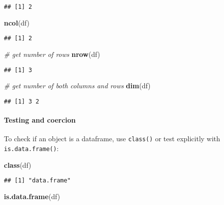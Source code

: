 \documentclass[
]{book}
\newenvironment{Shaded}{\begin{snugshade}}{\end{snugshade}}
\newcommand{\CommentTok}[1]{\textcolor[rgb]{0.56,0.35,0.01}{\textit{#1}}}
\newcommand{\KeywordTok}[1]{\textcolor[rgb]{0.13,0.29,0.53}{\textbf{#1}}}
\newcommand{\NormalTok}[1]{#1}
\begin{document}
\begin{verbatim}
## [1] 2
\end{verbatim}

\begin{Shaded}
\begin{Highlighting}[]
\KeywordTok{ncol}\NormalTok{(df)}
\end{Highlighting}
\end{Shaded}

\begin{verbatim}
## [1] 2
\end{verbatim}

\begin{Shaded}
\begin{Highlighting}[]
\CommentTok{\# get number of rows}
\KeywordTok{nrow}\NormalTok{(df)}
\end{Highlighting}
\end{Shaded}

\begin{verbatim}
## [1] 3
\end{verbatim}

\begin{Shaded}
\begin{Highlighting}[]
\CommentTok{\# get number of both columns and rows}
\KeywordTok{dim}\NormalTok{(df)}
\end{Highlighting}
\end{Shaded}

\begin{verbatim}
## [1] 3 2
\end{verbatim}

\hypertarget{testing-and-coercion}{%
\paragraph{Testing and coercion}\label{testing-and-coercion}}

To check if an object is a dataframe, use \texttt{class()} or test explicitly with \texttt{is.data.frame()}:

\begin{Shaded}
\begin{Highlighting}[]
\KeywordTok{class}\NormalTok{(df)}
\end{Highlighting}
\end{Shaded}

\begin{verbatim}
## [1] "data.frame"
\end{verbatim}

\begin{Shaded}
\begin{Highlighting}[]
\KeywordTok{is.data.frame}\NormalTok{(df)}
\end{Highlighting}
\end{Shaded}
\end{document}
